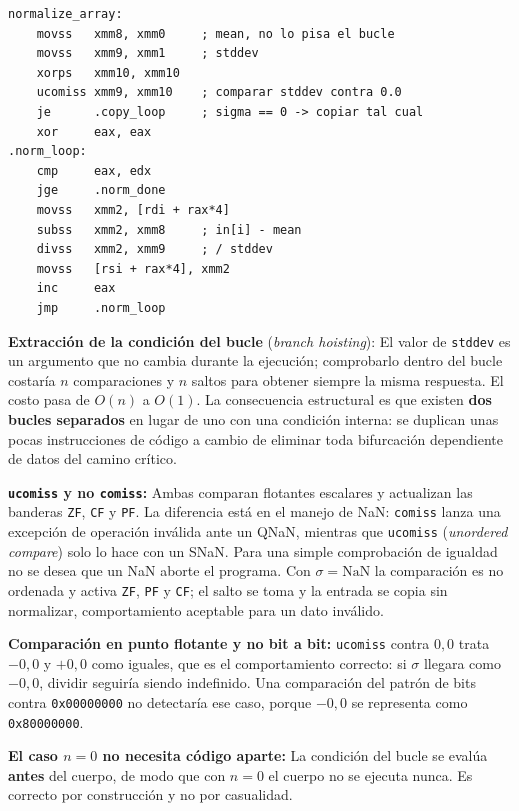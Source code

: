 \documentclass[journal]{IEEEtran}
\begin{document}
\begin{lstlisting}[caption={Decisión de ruta según \texttt{stddev},
  evaluada fuera del bucle.}, label={lst:esc-norm}]
normalize_array:
    movss   xmm8, xmm0     ; mean, no lo pisa el bucle
    movss   xmm9, xmm1     ; stddev
    xorps   xmm10, xmm10
    ucomiss xmm9, xmm10    ; comparar stddev contra 0.0
    je      .copy_loop     ; sigma == 0 -> copiar tal cual
    xor     eax, eax
.norm_loop:
    cmp     eax, edx
    jge     .norm_done
    movss   xmm2, [rdi + rax*4]
    subss   xmm2, xmm8     ; in[i] - mean
    divss   xmm2, xmm9     ; / stddev
    movss   [rsi + rax*4], xmm2
    inc     eax
    jmp     .norm_loop
\end{lstlisting}

\textbf{Extracción de la condición del bucle} (\textit{branch
hoisting}): El valor de \texttt{stddev} es un argumento que no cambia
durante la ejecución; comprobarlo dentro del bucle costaría $n$
comparaciones y $n$ saltos para obtener siempre la misma respuesta. El
costo pasa de $O(n)$ a $O(1)$. La consecuencia estructural es que existen
\textbf{dos bucles separados} en lugar de uno con una condición interna:
se duplican unas pocas instrucciones de código a cambio de eliminar toda
bifurcación dependiente de datos del camino crítico.

\textbf{\texttt{ucomiss} y no \texttt{comiss}:} Ambas comparan flotantes
escalares y actualizan las banderas \texttt{ZF}, \texttt{CF} y \texttt{PF}.
La diferencia está en el manejo de NaN: \texttt{comiss} lanza una
excepción de operación inválida ante un QNaN, mientras que
\texttt{ucomiss} (\textit{unordered compare}) solo lo hace con un SNaN.
Para una simple comprobación de igualdad no se desea que un NaN aborte
el programa. Con $\sigma = \mathrm{NaN}$ la comparación es no ordenada y activa
\texttt{ZF}, \texttt{PF} y \texttt{CF}; el salto se toma y la entrada
se copia sin normalizar, comportamiento aceptable para un dato inválido.

\textbf{Comparación en punto flotante y no bit a bit:} \texttt{ucomiss}
contra $0,0$ trata $-0,0$ y $+0,0$ como iguales, que es el
comportamiento correcto: si $\sigma$ llegara como $-0,0$, dividir
seguiría siendo indefinido. Una comparación del patrón de bits contra
\texttt{0x00000000} no detectaría ese caso, porque $-0,0$ se
representa como \texttt{0x80000000}.

\textbf{El caso $n = 0$ no necesita código aparte:} La condición del
bucle se evalúa \textbf{antes} del cuerpo, de modo que con $n = 0$ el
cuerpo no se ejecuta nunca. Es correcto por construcción y no por
casualidad.
\end{document}

